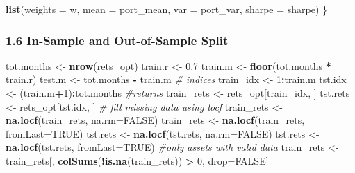 \documentclass[
  12pt,
]{article}
\newenvironment{Shaded}{\begin{snugshade}}{\end{snugshade}}
\newcommand{\AttributeTok}[1]{\textcolor[rgb]{0.13,0.29,0.53}{#1}}
\newcommand{\CommentTok}[1]{\textcolor[rgb]{0.56,0.35,0.01}{\textit{#1}}}
\newcommand{\ConstantTok}[1]{\textcolor[rgb]{0.56,0.35,0.01}{#1}}
\newcommand{\DecValTok}[1]{\textcolor[rgb]{0.00,0.00,0.81}{#1}}
\newcommand{\FloatTok}[1]{\textcolor[rgb]{0.00,0.00,0.81}{#1}}
\newcommand{\FunctionTok}[1]{\textcolor[rgb]{0.13,0.29,0.53}{\textbf{#1}}}
\newcommand{\NormalTok}[1]{#1}
\newcommand{\OtherTok}[1]{\textcolor[rgb]{0.56,0.35,0.01}{#1}}
\newcommand{\SpecialCharTok}[1]{\textcolor[rgb]{0.81,0.36,0.00}{\textbf{#1}}}
\begin{document}
\begin{Shaded}
\begin{Highlighting}[]
  \FunctionTok{list}\NormalTok{(}\AttributeTok{weights =}\NormalTok{ w, }\AttributeTok{mean =}\NormalTok{ port\_mean, }\AttributeTok{var =}\NormalTok{ port\_var, }\AttributeTok{sharpe =}\NormalTok{ sharpe)}
\NormalTok{\}}
\end{Highlighting}
\end{Shaded}

\subsubsection{1.6 In-Sample and Out-of-Sample
Split}\label{in-sample-and-out-of-sample-split}

\begin{Shaded}
\begin{Highlighting}[]
\NormalTok{tot.months }\OtherTok{\textless{}{-}} \FunctionTok{nrow}\NormalTok{(rets\_opt)}
\NormalTok{train.r }\OtherTok{\textless{}{-}} \FloatTok{0.7}
\NormalTok{train.m }\OtherTok{\textless{}{-}} \FunctionTok{floor}\NormalTok{(tot.months }\SpecialCharTok{*}\NormalTok{ train.r)}
\NormalTok{test.m  }\OtherTok{\textless{}{-}}\NormalTok{ tot.months }\SpecialCharTok{{-}}\NormalTok{ train.m}
\CommentTok{\# indices}
\NormalTok{train\_idx }\OtherTok{\textless{}{-}} \DecValTok{1}\SpecialCharTok{:}\NormalTok{train.m}
\NormalTok{tst.idx  }\OtherTok{\textless{}{-}}\NormalTok{ (train.m}\SpecialCharTok{+}\DecValTok{1}\NormalTok{)}\SpecialCharTok{:}\NormalTok{tot.months}
\CommentTok{\#returns}
\NormalTok{train\_rets }\OtherTok{\textless{}{-}}\NormalTok{ rets\_opt[train\_idx, ]}
\NormalTok{tst.rets  }\OtherTok{\textless{}{-}}\NormalTok{ rets\_opt[tst.idx, ]}
\CommentTok{\# fill missing data using locf}
\NormalTok{train\_rets }\OtherTok{\textless{}{-}} \FunctionTok{na.locf}\NormalTok{(train\_rets, }\AttributeTok{na.rm=}\ConstantTok{FALSE}\NormalTok{)}
\NormalTok{train\_rets }\OtherTok{\textless{}{-}} \FunctionTok{na.locf}\NormalTok{(train\_rets, }\AttributeTok{fromLast=}\ConstantTok{TRUE}\NormalTok{)}
\NormalTok{tst.rets  }\OtherTok{\textless{}{-}} \FunctionTok{na.locf}\NormalTok{(tst.rets, }\AttributeTok{na.rm=}\ConstantTok{FALSE}\NormalTok{)}
\NormalTok{tst.rets  }\OtherTok{\textless{}{-}} \FunctionTok{na.locf}\NormalTok{(tst.rets, }\AttributeTok{fromLast=}\ConstantTok{TRUE}\NormalTok{)}
\CommentTok{\#only assets with valid data}
\NormalTok{train\_rets }\OtherTok{\textless{}{-}}\NormalTok{ train\_rets[, }\FunctionTok{colSums}\NormalTok{(}\SpecialCharTok{!}\FunctionTok{is.na}\NormalTok{(train\_rets)) }\SpecialCharTok{\textgreater{}} \DecValTok{0}\NormalTok{, drop}\OtherTok{=}\ConstantTok{FALSE}\NormalTok{]}

\end{Highlighting}
\end{Shaded}
\end{document}
